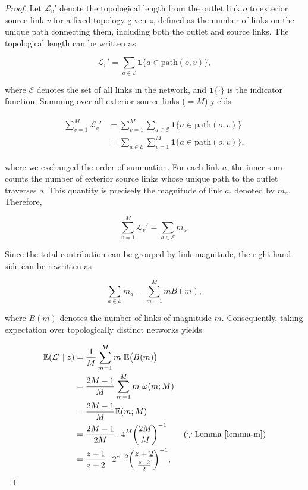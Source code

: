 \documentclass[11pt, class=article, crop=false]{standalone}
\theoremstyle{definition}
\begin{document}
\begin{proof}
Let $\mathcal{L}_{v}'$ denote the topological length from the outlet link $o$ to exterior source link $v$ for a fixed topology given $z$, defined as the number of links on the unique path connecting them, including both the outlet and source links.
The topological length can be written as

\begin{equation}
\mathcal{L}_{v}'
=
\sum_{a \in \mathcal{E}}
\mathbf{1}\{a \in \mathrm{path}(o,v)\},
\end{equation}

where $\mathcal{E}$ denotes the set of all links in the network, and $\mathbf{1}\{\cdot\}$ is the indicator function.
Summing over all exterior source links ($=M$) yields

\begin{align}
    \begin{split}
    \sum_{v = 1}^M \mathcal{L}_{v}'
    &= \sum_{v = 1}^M \sum_{a \in \mathcal{E}} \mathbf{1}\{a \in \mathrm{path}(o,v)\} \\
    &= \sum_{a \in \mathcal{E}} \sum_{v = 1}^M \mathbf{1}\{a \in \mathrm{path}(o,v)\},
    \end{split}
\end{align}

where we exchanged the order of summation.
For each link $a$, the inner sum counts the number of exterior source links whose unique path to the outlet traverses $a$. This quantity is precisely the magnitude of link $a$, denoted by $m_a$. Therefore,

\begin{equation}
\sum_{v=1}^{M} \mathcal{L}_{v}' = \sum_{a\in\mathcal{E}} m_a.
\end{equation}

Since the total contribution can be grouped by link magnitude, the right-hand side can be rewritten as

\begin{equation}
\sum_{a\in\mathcal{E}} m_a = \sum_{m=1}^{M} m B(m),
\end{equation}

where $B(m)$ denotes the number of links of magnitude $m$.
Consequently, taking expectation over topologically distinct networks yields

\begin{align}
\begin{split}
    \mathbb{E}(\mathcal{L}' \mid z) 
    &= \frac{1}{M} \sum_{m=1}^{M} m~\mathbb{E} \bigl( B(m) \bigr)\\
    &= \frac{2M - 1}{M} \sum_{m=1}^{M} m~\omega(m; M)\\
    &= \frac{2M - 1}{M} \mathbb{E}(m; M)\\
    &= \frac{2M - 1}{2M} \cdot 4^{M} \binom{2M}{M}^{-1} \qquad (\because \text{Lemma \ref{lemma-m}})\\
    &= \frac{z+1}{z+2} \cdot 2^{z+2} {\binom{z+2}{\frac{z + 2}{2}}}^{-1},
\end{split}
\end{align}


\end{proof}
\end{document}
